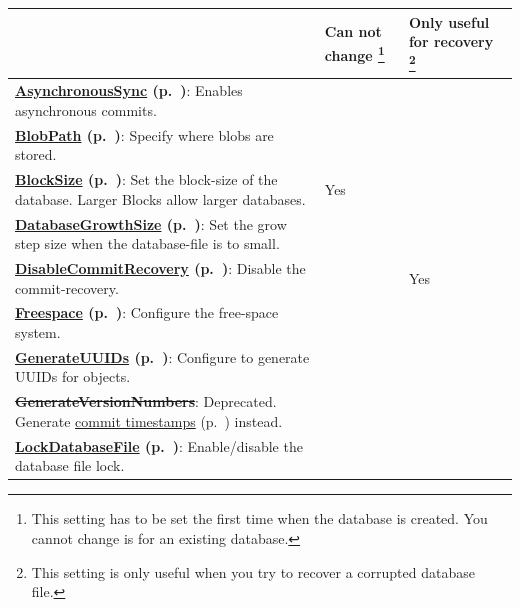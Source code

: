 {\small
\begin{longtable}{|p{}|p{}|p{}|}
\hline
 & Can not change \footnote{This setting has to be set the first time when the database is created. You cannot change is for an existing database.} & Only useful for recovery \footnote{This setting is only useful when you try to recover a corrupted database file.} \\ \hline
\textbf{\hyperref[ref:configuration-file-async-sync]{AsynchronousSync} (p.~\pageref{ref:configuration-file-async-sync})}: Enables asynchronous commits. &  &  \\ \hline
\textbf{\hyperref[ref:configuration-file-blob-path]{BlobPath} (p.~\pageref{ref:configuration-file-blob-path})}: Specify where blobs are stored. &  &  \\ \hline
\textbf{\hyperref[ref:configuration-file-block-size]{BlockSize} (p.~\pageref{ref:configuration-file-block-size})}: Set the block-size of the database. Larger Blocks allow larger databases. & Yes &  \\ \hline
\textbf{\hyperref[ref:configuration-file-database-growth-size]{DatabaseGrowthSize} (p.~\pageref{ref:configuration-file-database-growth-size})}: Set the grow step size when the database-file is to small. &  &  \\ \hline
\textbf{\hyperref[ref:configuration-file-disable-commit-recovery]{DisableCommitRecovery} (p.~\pageref{ref:configuration-file-disable-commit-recovery})}: Disable the commit-recovery. &  & Yes \\ \hline
\textbf{\hyperref[ref:configuration-file-freespace-configuration]{Freespace} (p.~\pageref{ref:configuration-file-freespace-configuration})}: Configure the free-space system. &  &  \\ \hline
\textbf{\hyperref[ref:configuration-file-generate-uuids]{GenerateUUIDs} (p.~\pageref{ref:configuration-file-generate-uuids})}: Configure to generate UUIDs for objects. &  &  \\ \hline
\textbf{\sout{GenerateVersionNumbers}}: Deprecated. Generate \hyperref[ref:configuration-file-generate-timestamps]{commit timestamps} (p.~\pageref{ref:configuration-file-generate-timestamps}) instead. &  &  \\ \hline
\textbf{\hyperref[ref:configuration-file-lock-database]{LockDatabaseFile} (p.~\pageref{ref:configuration-file-lock-database})}: Enable/disable the database file lock. &  &  \\ \hline

\end{longtable}}
